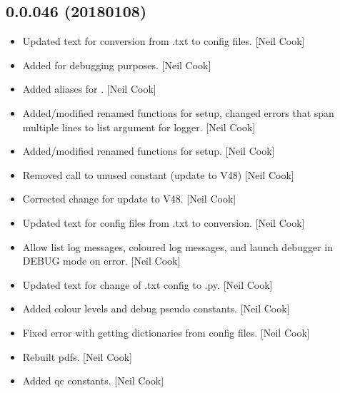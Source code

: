 \documentclass[a4paper,10pt,english]{report}
\begin{document}
\subsection{0.0.046 (2018\sphinxhyphen{}01\sphinxhyphen{}08)}
\label{\detokenize{misc/changelog:id525}}\begin{itemize}
\item {} 
Updated text for conversion from .txt to  config files. {[}Neil Cook{]}

\item {} 
Added  for debugging purposes. {[}Neil Cook{]}

\item {} 
Added aliases for . {[}Neil Cook{]}

\item {} 
Added/modified renamed functions for setup, changed errors that span
multiple lines to list argument for logger. {[}Neil Cook{]}

\item {} 
Added/modified renamed functions for setup. {[}Neil Cook{]}

\item {} 
Removed call to unused constant (update to V48) {[}Neil Cook{]}

\item {} 
Corrected change for update to V48. {[}Neil Cook{]}

\item {} 
Updated text for config files from .txt to  conversion. {[}Neil Cook{]}

\item {} 
Allow list log messages, coloured log messages, and launch debugger in
DEBUG mode on error. {[}Neil Cook{]}

\item {} 
Updated text for change of .txt config to .py. {[}Neil Cook{]}

\item {} 
Added colour levels and debug pseudo constants. {[}Neil Cook{]}

\item {} 
Fixed error with getting dictionaries from config files. {[}Neil Cook{]}

\item {} 
Rebuilt pdfs. {[}Neil Cook{]}

\item {} 
Added qc constants. {[}Neil Cook{]}


\end{itemize}
\end{document}
